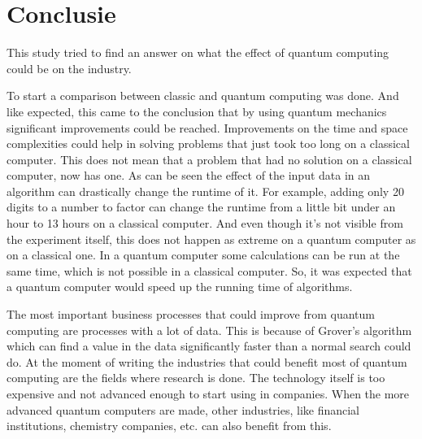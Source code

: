 
\chapter{Conclusie}
\label{ch:conclusie}


This study tried to find an answer on what the effect of quantum computing could be on the industry.

To start a comparison between classic and quantum computing was done. And like expected, this came to the conclusion that by using quantum mechanics significant improvements could be reached.
Improvements on the time and space complexities could help in solving problems that just took too long on a classical computer. This does not mean that a problem that had no solution on a classical computer, now has one.
As can be seen the effect of the input data in an algorithm can drastically change the runtime of it. For example, adding only 20 digits to a number to factor can change the runtime from a little bit under an hour to 13 hours on a classical computer.
And even though it's not visible from the experiment itself, this does not happen as extreme on a quantum computer as on a classical one.
In a quantum computer some calculations can be run at the same time, which is not possible in a classical computer. So, it was expected that a quantum computer would speed up the running time of algorithms.

The most important business processes that could improve from quantum computing are processes with a lot of data. This is because of Grover's algorithm which can find a value in the data significantly faster than a normal search could do.
At the moment of writing the industries that could benefit most of quantum computing are the fields where research is done. The technology itself is too expensive and not advanced enough to start using in companies.
When the more advanced quantum computers are made, other industries, like financial institutions, chemistry companies, etc. can also benefit from this.

